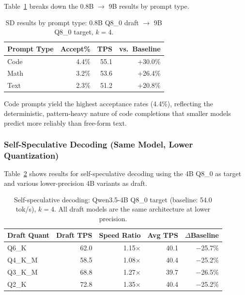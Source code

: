 \documentclass[11pt,a4paper]{article}
\begin{document}
Table~\ref{tab:sd_9b_prompt} breaks down the 0.8B $\rightarrow$ 9B results by
prompt type.

\begin{table}[h]
\centering
\caption{SD results by prompt type: 0.8B Q8\_0 draft $\rightarrow$ 9B Q8\_0 target, $k=4$.}
\label{tab:sd_9b_prompt}
\begin{tabular}{lrrr}
\toprule
\textbf{Prompt Type} & \textbf{Accept\%} & \textbf{TPS} & \textbf{vs.\ Baseline} \\
\midrule
Code & 4.4\% & 55.1 & +30.0\% \\
Math & 3.2\% & 53.6 & +26.4\% \\
Text & 2.3\% & 51.2 & +20.8\% \\
\bottomrule
\end{tabular}
\end{table}

Code prompts yield the highest acceptance rates (4.4\%), reflecting the
deterministic, pattern-heavy nature of code completions that smaller models
predict more reliably than free-form text.

\subsubsection{Self-Speculative Decoding (Same Model, Lower Quantization)}

Table~\ref{tab:sd_self} shows results for self-speculative decoding using the
4B Q8\_0 as target and various lower-precision 4B variants as draft.

\begin{table}[h]
\centering
\caption{Self-speculative decoding: Qwen3.5-4B Q8\_0 target (baseline: 54.0 tok/s), $k=4$.
All draft models are the same architecture at lower precision.}
\label{tab:sd_self}
\begin{tabular}{lrrrr}
\toprule
\textbf{Draft Quant} & \textbf{Draft TPS} & \textbf{Speed Ratio} & \textbf{Avg TPS} & \textbf{$\Delta$Baseline} \\
\midrule
Q6\_K & 62.0 & 1.15$\times$ & 40.1 & $-$25.7\% \\
Q4\_K\_M & 58.5 & 1.08$\times$ & 40.4 & $-$25.2\% \\
Q3\_K\_M & 68.8 & 1.27$\times$ & 39.7 & $-$26.5\% \\
Q2\_K   & 72.8 & 1.35$\times$ & 40.4 & $-$25.2\% \\
\bottomrule
\end{tabular}
\end{table}
\end{document}
